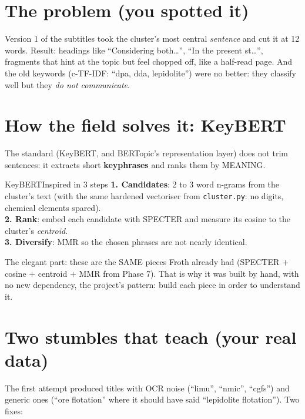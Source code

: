 \documentclass[11pt,a4paper]{article}
\begin{document}

\section{The problem (you spotted it)}

Version 1 of the subtitles took the cluster's most central \emph{sentence} and cut it at 12
words. Result: headings like ``Considering both\ldots'', ``In the present st\ldots'',
fragments that hint at the topic but feel chopped off, like a half-read page. And the old
keywords (c-TF-IDF: ``dpa, dda, lepidolite'') were no better: they classify well but they
\emph{do not communicate}.

\section{How the field solves it: KeyBERT}

The standard (KeyBERT, and BERTopic's representation layer) does not trim sentences: it
extracts short \textbf{keyphrases} and ranks them by MEANING.

\begin{concepto}{KeyBERTInspired in 3 steps}
\textbf{1. Candidates}: 2 to 3 word n-grams from the cluster's text (with the same hardened
vectoriser from \texttt{cluster.py}: no digits, chemical elements spared). \\
\textbf{2. Rank}: embed each candidate with SPECTER and measure its cosine to the cluster's
\emph{centroid}. \\
\textbf{3. Diversify}: MMR so the chosen phrases are not nearly identical.
\end{concepto}

The elegant part: these are the SAME pieces Froth already had (SPECTER $+$ cosine $+$ centroid
$+$ MMR from Phase 7). That is why it was built by hand, with no new dependency, the project's
pattern: build each piece in order to understand it.

\section{Two stumbles that teach (your real data)}

The first attempt produced titles with OCR noise (``limu'', ``nmic'', ``cgfs'') and generic ones
(``ore flotation'' where it should have said ``lepidolite flotation''). Two fixes:
\end{document}
